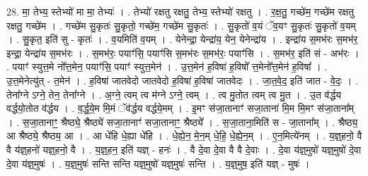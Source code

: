 \documentclass[17pt]{extarticle}
\begin{document}
28. मा॒ तेभ्य॒ स्तेभ्यो॑ मा मा॒ तेभ्यः॑ । . तेभ्यो॑ रक्षतु रक्षतु॒ तेभ्य॒ स्तेभ्यो॑ रक्षतु । . र॒क्ष॒तु॒ गच्छे॑म॒ गच्छे॑म रक्षतु रक्षतु॒ गच्छे॑म । . गच्छे॑म सु॒कृतः॑ सु॒कृतो॒ गच्छे॑म॒ गच्छे॑म सु॒कृतः॑ । . सु॒कृतो॑ व॒यं ॅव॒यꣳ सु॒कृतः॑ सु॒कृतो॑ व॒यम् । . सु॒कृत॒ इति॑ सु - कृतः॑ । . व॒यमिति॑ व॒यम् । . येनेन्द्रा॒ येन्द्रा॑य॒ येन॒ येनेन्द्रा॑य । . इन्द्रा॑य स॒मभ॑रः स॒मभ॑र॒ इन्द्रा॒ येन्द्रा॑य स॒मभ॑रः । . स॒मभ॑रः॒ पयाꣳ॑सि॒ पयाꣳ॑सि स॒मभ॑रः स॒मभ॑रः॒ पयाꣳ॑सि । . स॒मभ॑र॒ इति॑ सं - अभ॑रः । . पयाꣳ॑ स्युत्त॒मे नो᳚त्त॒मेन॒ पयाꣳ॑सि॒ पयाꣳ॑ स्युत्त॒मेन॑ । . उ॒त्त॒मेन॑ ह॒विषा॑ ह॒विषो᳚ त्त॒मेनो᳚त्त॒मेन॑ ह॒विषा᳚ । . उ॒त्त॒मेनेत्यु॑त् - त॒मेन॑ । . ह॒विषा॑ जातवेदो जातवेदो ह॒विषा॑ ह॒विषा॑ जातवेदः । . जा॒त॒वे॒द॒ इति॑ जात - वे॒दः॒ । . तेना᳚ग्ने ऽग्ने॒ तेन॒ तेना᳚ग्ने । . अ॒ग्ने॒ त्वम् त्व म॑ग्ने ऽग्ने॒ त्वम् । . त्व मु॒तोत त्वम् त्व मु॒त । . उ॒त व॑र्द्धय वर्द्धयो॒तोत व॑र्द्धय । . व॒र्द्ध॒ये॒म मि॒मं ॅव॑र्द्धय वर्द्धये॒मम् । . इ॒मꣳ स॑जा॒तानाꣳ॑ सजा॒ताना॑ मि॒म मि॒मꣳ स॑जा॒ताना᳚म् । . स॒जा॒तानाꣳ॒॒ श्रैष्ठ्ये॒ श्रैष्ठ्ये॑ सजा॒तानाꣳ॑ सजा॒तानाꣳ॒॒ श्रैष्ठ्ये᳚ । . स॒जा॒ताना॒मिति॑ स - जा॒ताना᳚म् । . श्रैष्ठ्य॒ आ श्रैष्ठ्ये॒ श्रैष्ठ्य॒ आ । . आ धे॑हि धे॒ह्या धे॑हि । . धे॒ह्ये॒न॒ मे॒न॒म् धे॒हि॒ धे॒ह्ये॒न॒म् । . ए॒न॒मित्ये॑नम् । . य॒ज्ञ्॒हनो॒ वै वै य॑ज्ञ्॒हनो॑ यज्ञ्॒हनो॒ वै । . य॒ज्ञ्॒हन॒ इति॑ यज्ञ् - हनः॑ । . वै दे॒वा दे॒वा वै वै दे॒वाः । . दे॒वा य॑ज्ञ्॒मुषो॑ यज्ञ्॒मुषो॑ दे॒वा दे॒वा य॑ज्ञ्॒मुषः॑ । . य॒ज्ञ्॒मुषः॑ सन्ति सन्ति यज्ञ्॒मुषो॑ यज्ञ्॒मुषः॑ सन्ति । . य॒ज्ञ्॒मुष॒ इति॑ यज्ञ् - मुषः॑ । \newline
\end{document}
